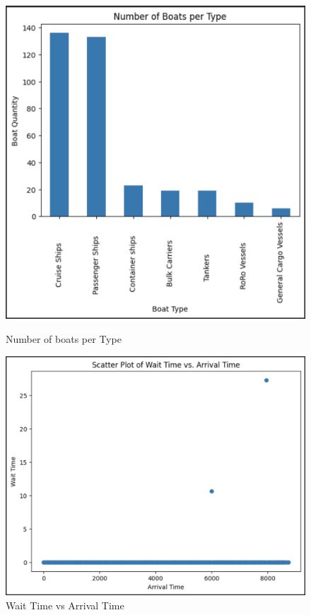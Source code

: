 \documentclass[12pt]{article}
\begin{document}
    \begin{figure}[H]
    \centering
    \begin{minipage}{0.5\textwidth}
        \centering
        \includegraphics[width=\linewidth]{SIMUlACION 3.1.png}  
        \caption{Number of boats per Type}
        \label{fig:grafica1}
    \end{minipage}\hfill
    \begin{minipage}{0.5\textwidth}
        \centering
        \includegraphics[width=\linewidth]{SIMUlACION 3.png}  
        \caption{Wait Time vs Arrival Time}
        \label{fig:grafica2}
    \end{minipage}
    \end{figure}
\end{document}
